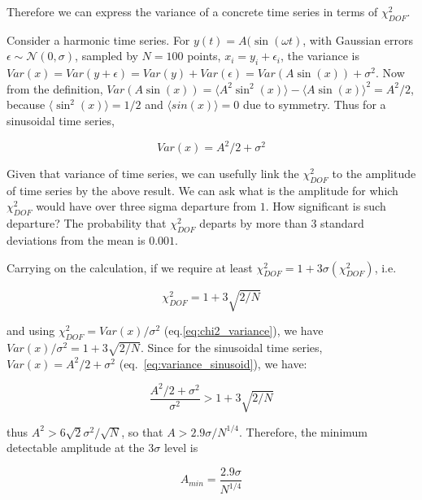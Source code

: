 \documentclass[fleqn,usenatbib]{mnras}  %
\begin{document}
Therefore we can express the variance of a concrete time series in terms of $\chi^{2}_{DOF}$. 

Consider a harmonic time series. For $y(t) = A(\sin(\omega t)$, with Gaussian errors $\epsilon \sim \mathcal{N}(0,\sigma)$, sampled by     $N=100$ points, $x_{i} = y_{i} + \epsilon_{i}$, the variance is $Var(x) = Var(y+\epsilon) = Var(y) + Var(\epsilon) = Var(A \sin(x)) + \sigma^{2}$. Now from the definition, $Var(A\sin(x)) = \langle A^{2} \sin^{2}(x) \rangle - \langle A \sin(x) \rangle ^{2} = A^{2} / 2 $, because $\langle \sin^{2}(x) \rangle = 1/2$ and $\langle sin(x)\rangle = 0$ due to symmetry. Thus for a sinusoidal time series,  

\begin{equation}
\label{eq:variance_sinusoid}
Var(x) = A^{2}/2  + \sigma^{2} 
\end{equation}

Given that variance of time series, we can usefully link the $\chi^{2}_{DOF}$ to the amplitude of time series by the above result. We can ask what is the amplitude for which  $\chi^{2}_{DOF}$ would have over three sigma departure from $1$. How significant is such departure?  The probability that $\chi^{2}_{DOF}$ departs by more than $3$ standard deviations from the mean is $0.001$.  

Carrying on the calculation, if we require at least $\chi^{2}_{DOF} = 1 + 3 \sigma(\chi^{2}_{DOF})$, i.e. 

\begin{equation} 
\label{eq:detectable_chi2}
\chi^{2}_{DOF} = 1 + 3 \sqrt{2/N}
\end{equation}

and using $\chi^{2}_{DOF}  = Var(x) / \sigma^{2}$ (eq.\ref{eq:chi2_variance}), we have $Var(x) / \sigma^{2} = 1 + 3 \sqrt{2/N}$. Since for the sinusoidal time series, $Var(x) = A^{2}/2  + \sigma^{2}$ (eq.~\ref{eq:variance_sinusoid}), we have: 

\begin{equation}
\label{eq:condition_to_detect}
\frac{A^{2}/2  + \sigma^{2}}{\sigma^{2}} >  1 + 3 \sqrt{2/N}
\end{equation}

thus  $A^{2} > 6 \sqrt{2} \sigma^{2} / \sqrt{N}$, so that $A > 2.9 \sigma / N^{1/4}$. Therefore, the minimum detectable amplitude at the $3 \sigma$ level is 

\begin{equation}
\label{eq:min_amplitude}
A_{min} = \frac{2.9 \sigma}{N^{1/4}}
\end{equation}
\end{document}
